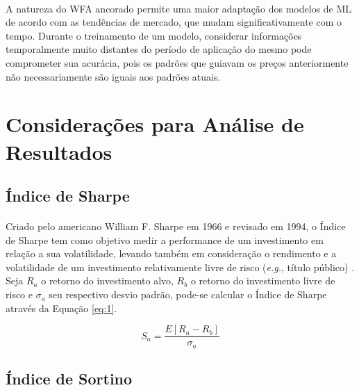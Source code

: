 \paragraph{} A natureza do WFA ancorado permite uma maior adaptação dos modelos de ML de acordo com as tendências de mercado, que mudam significativamente com o tempo. Durante o treinamento de um modelo, considerar informações temporalmente muito distantes do período de aplicação do mesmo pode comprometer sua acurácia, pois os padrões que guiavam os preços anteriormente não necessariamente são iguais aos padrões atuais.



\FloatBarrier
\section{Considerações para Análise de Resultados}



\FloatBarrier
\subsection{Índice de Sharpe}

\paragraph{} Criado pelo americano William F. Sharpe em 1966 e revisado em 1994, o Índice de Sharpe tem como objetivo medir a performance de um investimento em relação a sua volatilidade, levando também em consideração o rendimento e a volatilidade de um investimento relativamente livre de risco (\textit{e.g.}, título público) \cite{sharpe1998sharpe}. Seja \begin{math}R_a\end{math} o retorno do investimento alvo, \begin{math}R_b\end{math} o retorno do investimento livre de risco e \begin{math}\sigma_a\end{math} seu respectivo desvio padrão, pode-se calcular o Índice de Sharpe através da Equação \ref{eq:1}.

\begin{equation} \label{eq:1}
    S_a = \frac{E[R_a - R_b]}{\sigma_a}
\end{equation}



\FloatBarrier
\subsection{Índice de Sortino}

